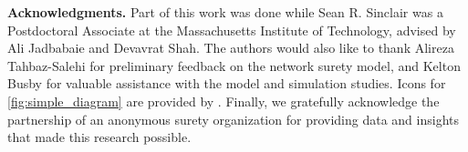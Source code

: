 \documentclass[mnsc,nonblindrev]{informs3}
\begin{document}
\medskip

\noindent\textbf{Acknowledgments.} Part of this work was done while Sean R. Sinclair was a Postdoctoral Associate at the Massachusetts Institute of Technology, advised by Ali Jadbabaie and Devavrat Shah. The authors would also like to thank Alireza Tahbaz-Salehi for preliminary feedback on the network surety model, and Kelton Busby for valuable assistance with the model and simulation studies.  Icons for \cref{fig:simple_diagram} are provided by \citet{flaticon2025}. Finally, we gratefully acknowledge the partnership of an anonymous surety organization for providing data and insights that made this research possible.


\newpage







%
%
%

\newpage

\end{document}
